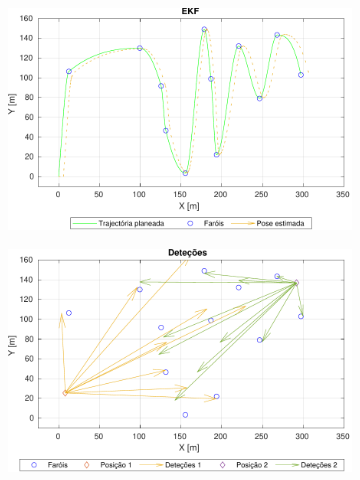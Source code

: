 \documentclass{article}
\begin{document}
\begin{figure}[ht]
     \begin{subfigure}[b]{0.49\textwidth}
         \centering
         \includegraphics[width=\textwidth]{figs/ekf.pdf}
         \caption{}
         \label{fig:planning_ekf}
     \end{subfigure}
     \hfill
     \begin{subfigure}[b]{0.49\textwidth}
         \centering
         \includegraphics[width=\textwidth]{figs/detections.pdf}
         \caption{}
         \label{fig:planning_detections}
     \end{subfigure}
     

\end{figure}
\end{document}
